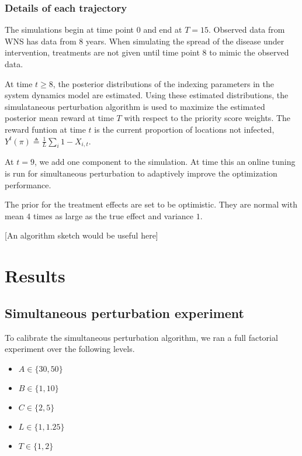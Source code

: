 \documentclass[11pt]{article}
\begin{document}
\subsubsection{Details of each trajectory}
\label{sec-4-1-2}

The simulations begin at time point $0$ and end at $T=15$.  Observed
data from WNS has data from $8$ years.  When simulating the spread
of the disease under intervention, treatments are not given until
time point $8$ to mimic the observed data.

At time $t \ge 8$, the posterior distributions of the indexing
parameters in the system dynamics model are estimated.  Using these
estimated distributions, the simulataneous perturbation algorithm is
used to maximize the estimated posterior mean reward at time $T$
with respect to the priority score weights.  The reward funtion at
time $t$ is the current proportion of locations not infected,
$Y^t(\pi) \triangleq \frac{1}{L}\sum_i 1 - X_{i,t}$.

At $t = 9$, we add one component to the simulation.  At time this an
online tuning is run for simultaneous perturbation to adaptively
improve the optimization performance.

The prior for the treatment effects are set to be optimistic.  They
are normal with mean $4$ times as large as the true effect and
variance $1$.

[An algorithm sketch would be useful here]


\section{Results}
\label{sec-5}

\subsection{Simultaneous perturbation experiment}
\label{sec-5-1}

To calibrate the simultaneous perturbation algorithm, we ran a full
factorial experiment over the following levels.
\begin{itemize}
  \item $A \in \lbrace 30, 50 \rbrace $
  \item $B \in \lbrace 1, 10 \rbrace $
  \item $C \in \lbrace 2, 5 \rbrace $
  \item $L \in \lbrace 1, 1.25 \rbrace $
  \item $T \in \lbrace 1, 2 \rbrace $
\end{itemize}
\end{document}
